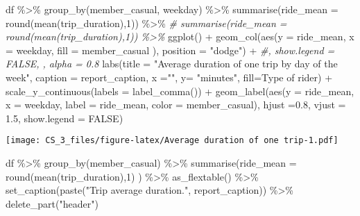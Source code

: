 \documentclass[
]{article}
\newenvironment{Shaded}{\begin{snugshade}}{\end{snugshade}}
\newcommand{\AttributeTok}[1]{\textcolor[rgb]{0.77,0.63,0.00}{#1}}
\newcommand{\CommentTok}[1]{\textcolor[rgb]{0.56,0.35,0.01}{\textit{#1}}}
\newcommand{\ConstantTok}[1]{\textcolor[rgb]{0.00,0.00,0.00}{#1}}
\newcommand{\DecValTok}[1]{\textcolor[rgb]{0.00,0.00,0.81}{#1}}
\newcommand{\FloatTok}[1]{\textcolor[rgb]{0.00,0.00,0.81}{#1}}
\newcommand{\FunctionTok}[1]{\textcolor[rgb]{0.00,0.00,0.00}{#1}}
\newcommand{\NormalTok}[1]{#1}
\newcommand{\SpecialCharTok}[1]{\textcolor[rgb]{0.00,0.00,0.00}{#1}}
\newcommand{\StringTok}[1]{\textcolor[rgb]{0.31,0.60,0.02}{#1}}
\begin{document}
\begin{Shaded}
\begin{Highlighting}[]
\NormalTok{df }\SpecialCharTok{\%\textgreater{}\%} 
  \FunctionTok{group\_by}\NormalTok{(member\_casual, weekday) }\SpecialCharTok{\%\textgreater{}\%} 
  \FunctionTok{summarise}\NormalTok{(}\AttributeTok{ride\_mean =} \FunctionTok{round}\NormalTok{(}\FunctionTok{mean}\NormalTok{(trip\_duration),}\DecValTok{1}\NormalTok{))  }\SpecialCharTok{\%\textgreater{}\%} 
  \CommentTok{\# summarise(ride\_mean = round(mean(trip\_duration),1))  \%\textgreater{}\%   }
  \FunctionTok{ggplot}\NormalTok{() }\SpecialCharTok{+}
  \FunctionTok{geom\_col}\NormalTok{(}\FunctionTok{aes}\NormalTok{(}\AttributeTok{y =}\NormalTok{ ride\_mean, }\AttributeTok{x =}\NormalTok{ weekday, }\AttributeTok{fill =}\NormalTok{ member\_casual ),}
           \AttributeTok{position =} \StringTok{"dodge"}\NormalTok{) }\SpecialCharTok{+} \CommentTok{\#, show.legend = FALSE, , alpha = 0.8}
  \FunctionTok{labs}\NormalTok{(}\AttributeTok{title =} \StringTok{"Average duration of one trip by day of the week"}\NormalTok{,}
       \AttributeTok{caption =}\NormalTok{ report\_caption,}
       \AttributeTok{x =}\StringTok{""}\NormalTok{, }\AttributeTok{y=} \StringTok{"minutes"}\NormalTok{,}
       \AttributeTok{fill=}\StringTok{\textquotesingle{}Type of rider\textquotesingle{}}\NormalTok{) }\SpecialCharTok{+}
  \FunctionTok{scale\_y\_continuous}\NormalTok{(}\AttributeTok{labels =} \FunctionTok{label\_comma}\NormalTok{()) }\SpecialCharTok{+}
\FunctionTok{geom\_label}\NormalTok{(}\FunctionTok{aes}\NormalTok{(}\AttributeTok{y =}\NormalTok{ ride\_mean, }\AttributeTok{x =}\NormalTok{ weekday, }\AttributeTok{label =}\NormalTok{ ride\_mean,}
               \AttributeTok{color =}\NormalTok{ member\_casual), }\AttributeTok{hjust =}\FloatTok{0.8}\NormalTok{, }\AttributeTok{vjust =} \FloatTok{1.5}\NormalTok{, }\AttributeTok{show.legend =} \ConstantTok{FALSE}\NormalTok{)}
\end{Highlighting}
\end{Shaded}

\texttt{[image: CS\_3\_files/figure-latex/Average duration of one trip-1.pdf]}

\begin{Shaded}
\begin{Highlighting}[]
\NormalTok{df }\SpecialCharTok{\%\textgreater{}\%} 
  \FunctionTok{group\_by}\NormalTok{(member\_casual) }\SpecialCharTok{\%\textgreater{}\%} 
  \FunctionTok{summarise}\NormalTok{(}\AttributeTok{ride\_mean =} \FunctionTok{round}\NormalTok{(}\FunctionTok{mean}\NormalTok{(trip\_duration),}\DecValTok{1}\NormalTok{) ) }\SpecialCharTok{\%\textgreater{}\%} 
  \FunctionTok{as\_flextable}\NormalTok{()  }\SpecialCharTok{\%\textgreater{}\%} 
\FunctionTok{set\_caption}\NormalTok{(}\FunctionTok{paste}\NormalTok{(}\StringTok{"Trip average duration."}\NormalTok{, report\_caption)) }\SpecialCharTok{\%\textgreater{}\%} \FunctionTok{delete\_part}\NormalTok{(}\StringTok{"header"}\NormalTok{)}
\end{Highlighting}
\end{Shaded}
\end{document}
